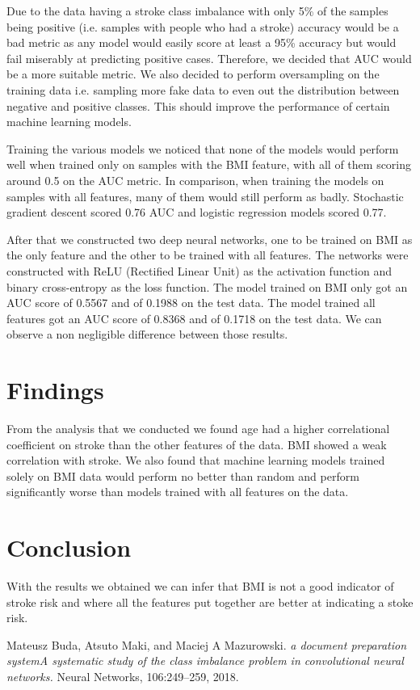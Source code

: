 \documentclass{article}
\begin{document}
Due to the data having a stroke class imbalance with only 5\% of the samples being positive (i.e. samples with people who had a stroke) accuracy would be a bad metric as any model would easily score at least a 95\% accuracy but would fail miserably at predicting positive cases. Therefore, we decided that AUC would be a more suitable metric. We also decided to perform oversampling on the training data i.e. sampling more fake data to even out the distribution between negative and positive classes. This should improve the performance of certain machine learning models.\cite{class-imba}

Training the various models we noticed that none of the models would perform well when trained only on samples with the BMI feature, with all of them scoring around 0.5 on the AUC metric. In comparison, when training the models on samples with all features, many of them would still perform as badly. Stochastic gradient descent scored 0.76 AUC and logistic regression models scored 0.77.

After that we constructed two deep neural networks, one to be trained on BMI as the only feature and the other to be trained with all features. The networks were constructed with ReLU (Rectified Linear Unit) as the activation function and binary cross-entropy as the loss function. The model trained on BMI only got an AUC score of 0.5567 and of 0.1988 on the test data. The model trained all features got an AUC score of 0.8368 and of 0.1718 on the test data. We can observe a non negligible difference between those results.

\section{Findings}
From the analysis that we conducted we found age had a higher correlational coefficient on stroke than the other features of the data. BMI showed a weak correlation with stroke. We also found that machine learning models trained solely on BMI data would perform no better than random and perform significantly worse than models trained with all features on the data.

\section{Conclusion}
With the results we obtained we can infer that BMI is not a good indicator of stroke risk and where
all the features put together are better at indicating a stoke risk.

\printbibliography
\begin{thebibliography}{1}
Mateusz Buda, Atsuto Maki, and Maciej A Mazurowski. \emph{a document preparation systemA systematic study of the class imbalance problem in convolutional neural networks.} Neural Networks, 106:249–259, 2018.
\end{thebibliography}
\end{document}

